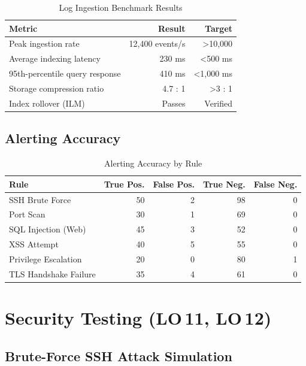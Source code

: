 \documentclass[12pt,a4paper]{report}
\begin{document}
\begin{table}[H]
\centering
\caption{Log Ingestion Benchmark Results}
\label{tab:perf}
\begin{tabular}{lrr}
\toprule
\textbf{Metric} & \textbf{Result} & \textbf{Target} \\
\midrule
Peak ingestion rate            & 12,400 events/s & \textgreater 10,000 \\
Average indexing latency        & 230 ms          & \textless 500 ms \\
95th-percentile query response  & 410 ms          & \textless 1,000 ms \\
Storage compression ratio       & 4.7 : 1         & \textgreater 3 : 1 \\
Index rollover (ILM)            & Passes          & Verified \\
\bottomrule
\end{tabular}
\end{table}

\subsection{Alerting Accuracy}

\begin{table}[H]
\centering
\caption{Alerting Accuracy by Rule}
\label{tab:alerts}
\begin{tabular}{lrrrr}
\toprule
\textbf{Rule} & \textbf{True Pos.} & \textbf{False Pos.} & \textbf{True Neg.} & \textbf{False Neg.} \\
\midrule
SSH Brute Force         & 50 & 2  & 98 & 0 \\
Port Scan               & 30 & 1  & 69 & 0 \\
SQL Injection (Web)     & 45 & 3  & 52 & 0 \\
XSS Attempt             & 40 & 5  & 55 & 0 \\
Privilege Escalation    & 20 & 0  & 80 & 1 \\
TLS Handshake Failure   & 35 & 4  & 61 & 0 \\
\bottomrule
\end{tabular}
\end{table}

\section{Security Testing (LO\,11, LO\,12)}

\subsection{Brute-Force SSH Attack Simulation}
\end{document}
